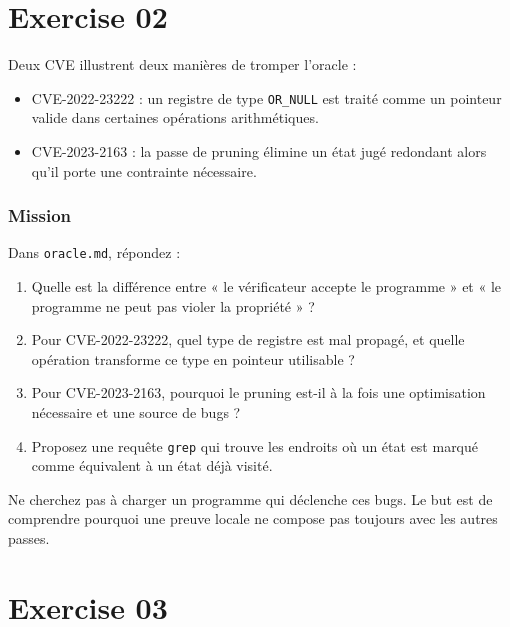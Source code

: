 \documentclass{training}
\begin{document}
\chapter{Exercise 02}
\makeheaderfiles

Deux CVE illustrent deux manières de tromper l'oracle :

\begin{itemize}
  \item CVE-2022-23222 : un registre de type \texttt{OR\_NULL} est traité
        comme un pointeur valide dans certaines opérations arithmétiques.
  \item CVE-2023-2163 : la passe de pruning élimine un état jugé redondant
        alors qu'il porte une contrainte nécessaire.
\end{itemize}

\subsection*{Mission}

Dans \texttt{oracle.md}, répondez :

\begin{enumerate}
  \item Quelle est la différence entre « le vérificateur accepte le
        programme » et « le programme ne peut pas violer la propriété » ?
  \item Pour CVE-2022-23222, quel type de registre est mal propagé, et
        quelle opération transforme ce type en pointeur utilisable ?
  \item Pour CVE-2023-2163, pourquoi le pruning est-il à la fois une
        optimisation nécessaire et une source de bugs ?
  \item Proposez une requête \texttt{grep} qui trouve les endroits où un
        état est marqué comme équivalent à un état déjà visité.
\end{enumerate}

\begin{warn}
Ne cherchez pas à charger un programme qui déclenche ces bugs. Le but est
de comprendre pourquoi une preuve locale ne compose pas toujours avec les
autres passes.
\end{warn}

\chapter{Exercise 03}
\makeheaderfiles
\end{document}
